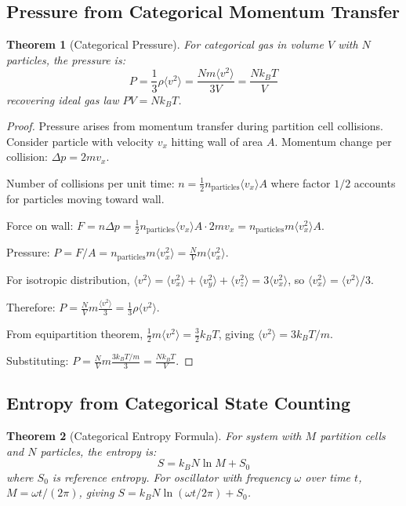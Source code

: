 \documentclass[twocolumn,10pt]{article}
\newtheorem{theorem}{Theorem}[section]
\begin{document}
\subsection{Pressure from Categorical Momentum Transfer}

\begin{theorem}[Categorical Pressure]
\label{thm:categorical_pressure}
For categorical gas in volume $V$ with $N$ particles, the pressure is:
\begin{equation}
P = \frac{1}{3}\rho \langle v^2 \rangle = \frac{Nm\langle v^2 \rangle}{3V} = \frac{Nk_BT}{V}
\end{equation}
recovering ideal gas law $PV = Nk_BT$.
\end{theorem}

\begin{proof}
Pressure arises from momentum transfer during partition cell collisions. Consider particle with velocity $v_x$ hitting wall of area $A$. Momentum change per collision: $\Delta p = 2mv_x$.

Number of collisions per unit time: $n = \frac{1}{2}n_{\text{particles}} \langle v_x \rangle A$ where factor $1/2$ accounts for particles moving toward wall.

Force on wall: $F = n \Delta p = \frac{1}{2}n_{\text{particles}} \langle v_x \rangle A \cdot 2mv_x = n_{\text{particles}} m \langle v_x^2 \rangle A$.

Pressure: $P = F/A = n_{\text{particles}} m \langle v_x^2 \rangle = \frac{N}{V} m \langle v_x^2 \rangle$.

For isotropic distribution, $\langle v^2 \rangle = \langle v_x^2 \rangle + \langle v_y^2 \rangle + \langle v_z^2 \rangle = 3\langle v_x^2 \rangle$, so $\langle v_x^2 \rangle = \langle v^2 \rangle/3$.

Therefore: $P = \frac{N}{V} m \frac{\langle v^2 \rangle}{3} = \frac{1}{3}\rho \langle v^2 \rangle$.

From equipartition theorem, $\frac{1}{2}m\langle v^2 \rangle = \frac{3}{2}k_BT$, giving $\langle v^2 \rangle = 3k_BT/m$.

Substituting: $P = \frac{N}{V} m \frac{3k_BT/m}{3} = \frac{Nk_BT}{V}$.
\end{proof}

\subsection{Entropy from Categorical State Counting}

\begin{theorem}[Categorical Entropy Formula]
\label{thm:categorical_entropy}
For system with $M$ partition cells and $N$ particles, the entropy is:
\begin{equation}
S = k_B N \ln M + S_0
\end{equation}
where $S_0$ is reference entropy. For oscillator with frequency $\omega$ over time $t$, $M = \omega t/(2\pi)$, giving $S = k_B N \ln(\omega t/2\pi) + S_0$.
\end{theorem}
\end{document}
